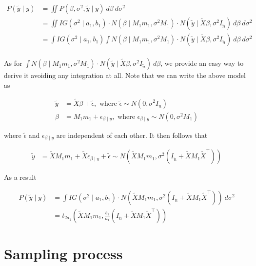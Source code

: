 \documentclass[
]{book}
\theoremstyle{definition}
\theoremstyle{definition}
\theoremstyle{definition}
\theoremstyle{definition}
\theoremstyle{remark}
\begin{document}
\begin{align}
P(\tilde{y} \mid y) 
&=\iint P\left(\beta, \sigma^{2}, \tilde{y} \mid y\right) \  d\beta \  d\sigma^{2} \\
&=\iint IG(\sigma^{2} \mid a_{1}, b_{1}) \cdot N\left(\beta \mid M_{1} m_{1}, \sigma^{2} M_{1} \right) \cdot N\left(\tilde{y} \mid \tilde{X} \beta, \sigma^{2} I_{\tilde{n}}\right) \  d\beta \  d\sigma^{2} \\
&=\int IG(\sigma^{2} \mid a_{1}, b_{1}) \int N\left(\beta \mid M_{1} m_{1}, \sigma^{2} M_{1} \right) \cdot N\left(\tilde{y} \mid \tilde{X} \beta, \sigma^{2} I_{\tilde{n}}\right) \  d\beta \  d\sigma^{2} \\
\end{align}

As for \(\int N\left(\beta \mid M_{1} m_{1}, \sigma^{2} M_{1}\right) \cdot N\left(\tilde{y} \mid \tilde{X} \beta, \sigma^{2} I_{\tilde{n}}\right) \  d\beta\), we provide an easy way to derive it avoiding any integration at all. Note that we can write the above model as

\begin{align}
\tilde{y} &= \tilde{X} \beta + \tilde{\epsilon}, \text{ where } \tilde{\epsilon} \sim N(0,\sigma^2 I_{\tilde{n}}) \\
\beta &= M_{1} m_{1} + \epsilon_{\beta \mid y}, \text{ where } \epsilon_{\beta \mid y} \sim N(0,\sigma^2M_{1})
\end{align}

where \(\tilde{\epsilon}\) and \(\epsilon_{\beta \mid y}\) are independent of each other. It then follows that

\begin{align}
\tilde{y} &= \tilde{X} M_{1} m_{1} + \tilde{X} \epsilon_{\beta \mid y} + \tilde{\epsilon} 
\sim N(\tilde{X} M_{1} m_{1}, \sigma^2(I_{\tilde{n}} + \tilde{X} M_{1} \tilde{X}^{\top}))
\end{align}

As a result

\begin{align}
P(\tilde{y} \mid y) 
&=\int IG(\sigma^{2} \mid a_{1}, b_{1}) \cdot N(\tilde{X} M_{1} m_{1}, \sigma^2(I_{\tilde{n}} + \tilde{X} M_{1} \tilde{X}^{\top})) \  d\sigma^{2} \\
&= t_{2a_1}(\tilde{X} M_1 m_1, \frac{b_1}{a_1}(I_{\tilde{n}} + \tilde{X} M_{1} \tilde{X}^{\top})) \;
\end{align}

\hypertarget{sampling-process}{%
\section{Sampling process}\label{sampling-process}}
\end{document}
